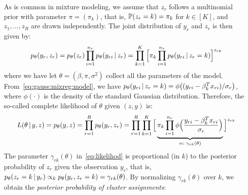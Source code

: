 \documentclass[12pt]{article}
\begin{document}

As is common in mixture modeling, we assume that $z_r$ follows a multinomial prior with parameter $\pi = (\pi_k)$, that is, $\mathbb{P}(z_r = k) = \pi_k$ for $k \in [K]$, and $z_1,\dots,z_R$ are drawn independently.
%
The joint distribution of $y_r$ and $z_r$ is then given by:
\begin{align}
	p_{\theta}(y_r,z_r) = p_\theta(z_r) \prod_{i=1}^{n_r} p_\theta(y_{ri} \,|\, z_r) 
	= \prod_{k=1}^K \Big[\pi_k \prod_{i=1}^{n_r} p_\theta(y_{ri} \,|\, z_r = k)\Big]^{z_{rk}}
\end{align}
where we have let $\theta = (\beta,\pi,\sigma^2)$ collect all the parameters of the model.
From~\eqref{eq:gauss:mixreg:model}, we have %
$p_\theta(y_{ri} \,|\, z_r = k) = \phi\big( (y_{ri} - \beta_k^T x_{ri})/\sigma_r \big)$, where $\phi(\cdot)$ is the density of the standard Gaussian distribution.
Therefore, the so-called complete likelihood of $\theta$ given $(z,y)$ is:
\begin{align}\label{eq:likelihod}
	L(\theta \,|\,  y, z)= p_\theta(y,z) = \prod_{r=1}^R p_{\theta}(y_r,z_r) = \prod_{r=1}^R \prod_{k=1}^K \Big[\underbrace{\pi_k \prod_{i=1}^{n_r} \phi\Big( \frac{y_{ri} - \beta_k^T x_{ri}}{\sigma_r} \Big)}_{ =: \; \gamma_{rk}(\theta)} \Big]^{z_{rk}}
\end{align}
The parameter $\gamma_{rk}(\theta)$ in~\eqref{eq:likelihod} is proportional (in $k$) to the posterior probability of $z_r$ given the observation $y_r$, that is, $p_\theta(z_r = k \,|\, y_r) \propto_k p_\theta(y_r,z_r = k ) = \gamma_{rk}(\theta)$. By normalizing $\gamma_{rk}(\theta)$ over $k$, we obtain the \emph{posterior probability of cluster assignments}:
\end{document}
